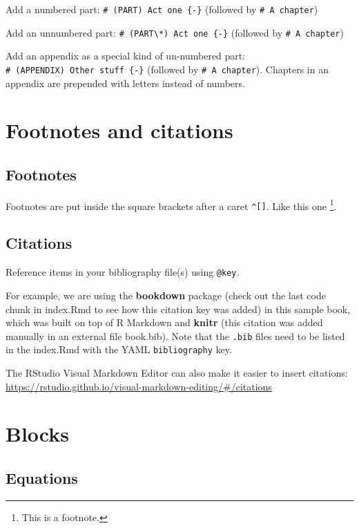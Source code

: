 \documentclass[
]{book}
\theoremstyle{definition}
\theoremstyle{definition}
\theoremstyle{definition}
\theoremstyle{definition}
\theoremstyle{remark}
\begin{document}
Add a numbered part: \texttt{\#\ (PART)\ Act\ one\ \{-\}} (followed by \texttt{\#\ A\ chapter})

Add an unnumbered part: \texttt{\#\ (PART\textbackslash{}*)\ Act\ one\ \{-\}} (followed by \texttt{\#\ A\ chapter})

Add an appendix as a special kind of un-numbered part: \texttt{\#\ (APPENDIX)\ Other\ stuff\ \{-\}} (followed by \texttt{\#\ A\ chapter}). Chapters in an appendix are prepended with letters instead of numbers.

\chapter{Footnotes and citations}\label{footnotes-and-citations}

\section{Footnotes}\label{footnotes}

Footnotes are put inside the square brackets after a caret \texttt{\^{}{[}{]}}. Like this one \footnote{This is a footnote.}.

\section{Citations}\label{citations}

Reference items in your bibliography file(s) using \texttt{@key}.

For example, we are using the \textbf{bookdown} package \citep{R-bookdown} (check out the last code chunk in index.Rmd to see how this citation key was added) in this sample book, which was built on top of R Markdown and \textbf{knitr} \citep{xie2015} (this citation was added manually in an external file book.bib).
Note that the \texttt{.bib} files need to be listed in the index.Rmd with the YAML \texttt{bibliography} key.

The RStudio Visual Markdown Editor can also make it easier to insert citations: \url{https://rstudio.github.io/visual-markdown-editing/\#/citations}

\chapter{Blocks}\label{blocks}

\section{Equations}\label{equations}
\end{document}
